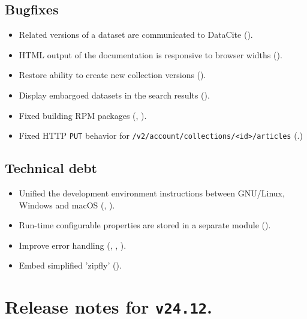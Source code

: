 \subsection*{Bugfixes}
\begin{itemize}
  \item{Related versions of a dataset are communicated to DataCite
      ().}
  \item{HTML output of the documentation is responsive to browser widths
      ().}
  \item{Restore ability to create new collection versions
      ().}
  \item{Display embargoed datasets in the search results
      ().}
  \item{Fixed building RPM packages (,
      ).}
  \item{Fixed HTTP \texttt{PUT} behavior for \texttt{/v2/account/collections/<id>/articles}
      (.)}
\end{itemize}
\subsection*{Technical debt}
\begin{itemize}
  \item{Unified the development environment instructions between GNU/Linux,
      Windows and macOS (,
      ).}
  \item{Run-time configurable properties are stored in a separate module
      ().}
  \item{Improve error handling (,
      ,
      ).}
  \item{Embed simplified 'zipfly' ().}
\end{itemize}

\section*{Release notes for \texttt{v24.12}.}

